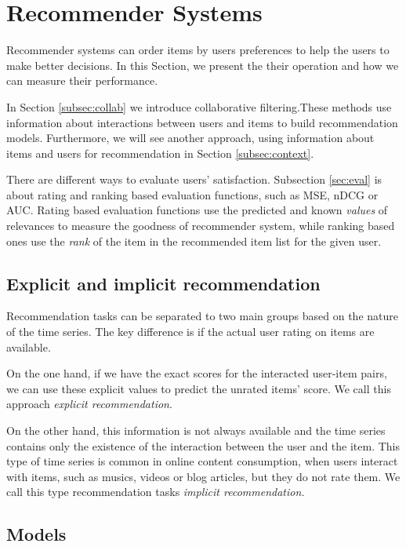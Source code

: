 

\chapter{Recommender Systems}\label{ch:rec_sys}
Recommender systems can order items by users preferences to help the users to
make better decisions. In this Section, we present the
their operation and how we can measure their performance.

In Section \ref{subsec:collab} we introduce collaborative filtering.These methods use
information about interactions between users and items to build recommendation models. 
Furthermore, we will see another approach, using information about items and users for
recommendation in Section \ref{subsec:context}.

There are different ways to evaluate users' satisfaction. Subsection \ref{sec:eval} is about 
rating and ranking based evaluation functions, such as MSE, nDCG or AUC.
Rating based evaluation functions use the predicted and known \emph{values} of relevances 
to measure the goodness of  recommender system, while ranking based ones use the
\emph{rank} of the item in  the recommended item list for the given user.

\section{Explicit and implicit recommendation}\label{sec:exp_inpl}
Recommendation tasks can be separated to two main groups based on the nature of the
time series. The key difference is if the actual user rating on items are available.

On the one hand, if we have the exact scores for the interacted user-item pairs, we 
can use these explicit values to predict the unrated items'
score. We call this approach \emph{explicit recommendation}.

On the other hand, this information is not always available 
and the time series contains only the existence of the 
interaction between the user and the item. This type of time 
series is common in online content consumption, when users interact with 
 items, such as musics, videos  or blog articles, but they do not 
rate them.  We call this type recommendation tasks \emph{implicit recommendation.}

\section{Models}
